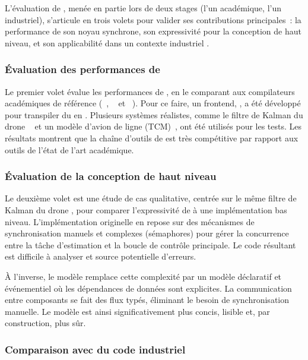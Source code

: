 L'évaluation de \GRust, menée en partie lors de deux stages (l'un académique, l'un industriel),
s'articule en trois volets pour valider ses contributions principales~: la performance de son noyau
synchrone, son expressivité pour la conception de haut niveau, et son applicabilité dans un
contexte industriel \sdv.

\subsubsection{Évaluation des performances de \GRSync}

Le premier volet évalue les performances de \GRSync, en le comparant aux compilateurs académiques
\Lustre de référence (\Heptagon~\cite{heptagon}, \LustreC~\cite{lustrec} et \Velus~\cite{velus}).
Pour ce faire, un frontend, \GLustre, a été développé pour transpiler du \Lustre en \GRSync.
Plusieurs systèmes réalistes, comme le filtre de Kalman du drone \crazyflie~\cite{crazyflie-fm} et
un modèle d'avion de ligne (TCM)~\cite{tcmOriginal,tcmCocospec}, ont été utilisés pour les tests.
%
Les résultats montrent que la chaîne d'outils de \GRSync est très compétitive par rapport aux outils
de l'état de l'art académique.

\subsubsection{Évaluation de la conception de haut niveau}

Le deuxième volet est une étude de cas qualitative, centrée sur le même filtre de Kalman du drone
\crazyflie, pour comparer l'expressivité de \GRust à une implémentation bas niveau. L'implémentation
originelle en \Ci repose sur des mécanismes de synchronisation manuels et complexes (sémaphores)
pour gérer la concurrence entre la tâche d'estimation et la boucle de contrôle principale. Le code
résultant est difficile à analyser et source potentielle d'erreurs.

À l'inverse, le modèle \GRust remplace cette complexité par un modèle déclaratif et événementiel où
les dépendances de données sont explicites. La communication entre composants se fait \via des flux
typés, éliminant le besoin de synchronisation manuelle. Le modèle \GRust est ainsi significativement
plus concis, lisible et, par construction, plus sûr.

\subsubsection{Comparaison avec du code \Rust industriel}


